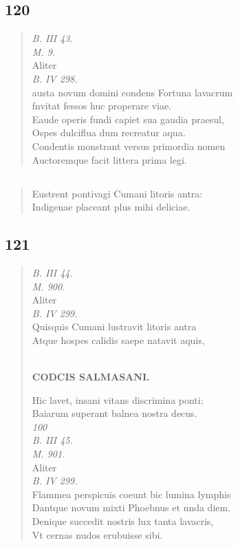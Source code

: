 \documentclass[11pt, a4paper]{report}
\begin{document}
            \subsection*{120}
      \begin{verse}
      \textit{B. III 43.} \\ \textit{M. 9.} \\ Aliter \\ \textit{B. IV 298.} \\ austa novum domini condens Fortuna lavacrum \\ fnvitat fessos huc properare viae. \\ Eaude operis fundi capiet sua gaudia praesul, \\ Ospes dulciflua dum recreatur aqua. \\ Condentis monstrant versus primordia nomen \\ Auctoremque facit littera prima legi. \\ 
      \end{verse}
  
            \subsection*{}
      \begin{verse}
      Eustrent pontivagi Cumani litoris antra: \\ Indigenae placeant plus mihi deliciae. \\ 
      \end{verse}
  
            \subsection*{121}
      \begin{verse}
      \textit{B. III 44.} \\ \textit{M. 900.} \\ Aliter \\ \textit{B. IV 299.} \\ Quisquis Cumani lustravit litoris antra \\ Atque hospes calidis saepe natavit aquis, \\ 
        ﻿\pagebreak 
    \begin{center} \textbf{CODCIS SALMASANI.} \end{center} \marginpar{[135]} Hic lavet, insani vitans discrimina ponti; \\ Baiarum superant balnea nostra decus. \\ \textit{100} \\ \textit{B. III 45.} \\ \textit{M. 901.} \\ Aliter \\ \textit{B. IV 299.} \\ Flammea perspicuis coeunt bic lumina lymphis \\ Dantque novum mixti Phoebnus et unda diem. \\ Denique succedit nostris lux tanta lavacris, \\ Vt cernas nudos erubuisse sibi. \\ 
      \end{verse}
  
\end{document}
